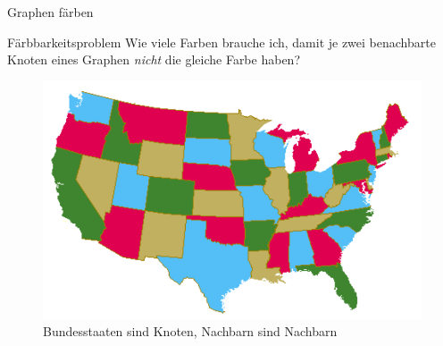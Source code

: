 \documentclass[18pt]{beamer}
\begin{document}
    \begin{frame}{Graphen färben}
        \begin{block}{Färbbarkeitsproblem}
            Wie viele Farben brauche ich, damit je zwei benachbarte Knoten
            eines Graphen \emph{nicht} die gleiche Farbe haben?
        \end{block}
        \pause
        \begin{figure}[]
            \centering
            \includegraphics[keepaspectratio, width=.5\textwidth]{figures/usa.png}
            \caption{Bundesstaaten sind Knoten, Nachbarn sind Nachbarn}
        \end{figure}
    \end{frame}
\end{document}
